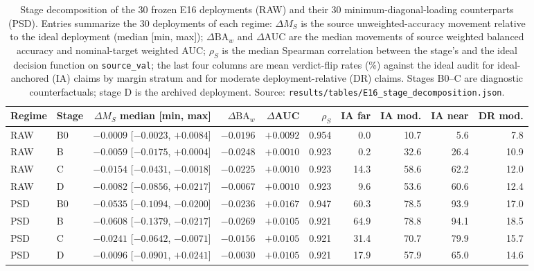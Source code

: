 \documentclass[11pt,a4paper]{article}
\begin{document}
\begin{table}[H]
\centering
\scriptsize
\setlength{\tabcolsep}{3pt}
\caption{Stage decomposition of the 30 frozen E16 deployments (RAW) and their
30 minimum-diagonal-loading counterparts (PSD). Entries summarize the 30
deployments of each regime: $\Delta M_S$ is the source unweighted-accuracy
movement relative to the ideal deployment (median [min, max]);
$\Delta\mathrm{BA}_w$ and $\Delta$AUC are the median movements of source
weighted balanced accuracy and nominal-target weighted AUC; $\rho_S$ is the
median Spearman correlation between the stage's and the ideal decision
function on \texttt{source\_val}; the last four columns are mean verdict-flip
rates (\%) against the ideal audit for ideal-anchored (IA) claims by margin
stratum and for moderate deployment-relative (DR) claims. Stages B0--C are
diagnostic counterfactuals; stage D is the archived deployment. Source:
\texttt{results/tables/E16\_stage\_decomposition.json}.}
\label{tab:stage-decomposition}
\begin{tabular}{llrrrrrrrr}
\toprule
Regime & Stage & $\Delta M_S$ median [min, max] & $\Delta\mathrm{BA}_w$ & $\Delta$AUC & $\rho_S$ & IA far & IA mod. & IA near & DR mod. \\
\midrule
RAW & B0 & $-0.0009$ [$-0.0023$, $+0.0084$] & $-0.0196$ & $+0.0092$ & 0.954 & 0.0 & 10.7 & 5.6 & 7.8 \\
RAW & B & $-0.0059$ [$-0.0175$, $+0.0004$] & $-0.0248$ & $+0.0010$ & 0.923 & 0.2 & 32.6 & 26.4 & 10.9 \\
RAW & C & $-0.0154$ [$-0.0431$, $-0.0018$] & $-0.0225$ & $+0.0010$ & 0.923 & 14.3 & 58.6 & 62.2 & 12.0 \\
RAW & D & $-0.0082$ [$-0.0856$, $+0.0217$] & $-0.0067$ & $+0.0010$ & 0.923 & 9.6 & 53.6 & 60.6 & 12.4 \\
PSD & B0 & $-0.0535$ [$-0.1094$, $-0.0200$] & $-0.0236$ & $+0.0167$ & 0.947 & 60.3 & 78.5 & 93.9 & 17.0 \\
PSD & B & $-0.0608$ [$-0.1379$, $-0.0217$] & $-0.0269$ & $+0.0105$ & 0.921 & 64.9 & 78.8 & 94.1 & 18.5 \\
PSD & C & $-0.0241$ [$-0.0642$, $-0.0071$] & $-0.0156$ & $+0.0105$ & 0.921 & 31.4 & 70.7 & 79.9 & 15.7 \\
PSD & D & $-0.0096$ [$-0.0901$, $+0.0241$] & $-0.0030$ & $+0.0105$ & 0.921 & 17.9 & 57.9 & 65.0 & 14.6 \\
\bottomrule
\end{tabular}
\end{table}

\clearpage
\end{document}
